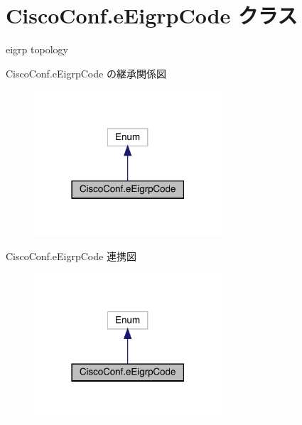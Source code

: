 \hypertarget{classCiscoConf_1_1eEigrpCode}{}\section{Cisco\+Conf.\+e\+Eigrp\+Code クラス}
\label{classCiscoConf_1_1eEigrpCode}


eigrp topology  




Cisco\+Conf.\+e\+Eigrp\+Code の継承関係図
\nopagebreak
\begin{figure}[H]
\begin{center}
\leavevmode
\includegraphics[width=198pt]{classCiscoConf_1_1eEigrpCode__inherit__graph}
\end{center}
\end{figure}


Cisco\+Conf.\+e\+Eigrp\+Code 連携図
\nopagebreak
\begin{figure}[H]
\begin{center}
\leavevmode
\includegraphics[width=198pt]{classCiscoConf_1_1eEigrpCode__coll__graph}
\end{center}
\end{figure}
